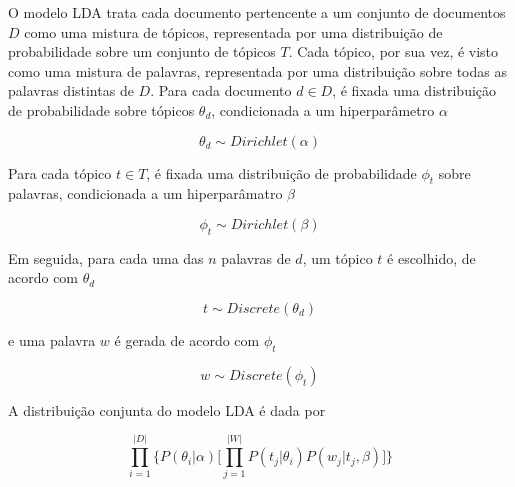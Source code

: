 


O modelo LDA trata cada documento pertencente a um conjunto de documentos \ensuremath{D} como uma mistura de tópicos, representada por uma distribuição de probabilidade sobre um conjunto de tópicos \ensuremath{T}. Cada tópico, por sua vez, é visto como uma mistura de palavras, representada por uma distribuição sobre todas as palavras distintas de \ensuremath{D}. Para cada documento \ensuremath{d \in D}, é fixada uma distribuição de probabilidade sobre tópicos \ensuremath{\theta_d}, condicionada a um hiperparâmetro \ensuremath{\alpha}

\begin{equation}
\label{lda:topic}
\ensuremath{\theta_d \sim Dirichlet(\alpha)}
\end{equation}

Para cada tópico \ensuremath{t \in T}, é fixada uma distribuição de probabilidade \ensuremath{\phi_t} sobre palavras, condicionada a um hiperparâmatro \ensuremath{\beta}

\begin{equation}
\label{lda:word}
\ensuremath{\phi_t \sim Dirichlet(\beta)}
\end{equation}

Em seguida, para cada uma das \ensuremath{n} palavras de \ensuremath{d}, um tópico \ensuremath{t} é escolhido, de acordo com \ensuremath{\theta_d}

\begin{equation}
\label{lda:topic-chosen}
\ensuremath{t \sim Discrete(\theta_d)}
\end{equation}

e uma palavra \ensuremath{w} é gerada de acordo com \ensuremath{\phi_t}

\begin{equation}
\label{lda:word-chosen}
\ensuremath{w \sim Discrete(\phi_t)}
\end{equation}

A distribuição conjunta do modelo LDA é dada por

\begin{equation}
\label{joint:lda}
\ensuremath{\prod_{i=1}^{|D|} \bigg\{P(\theta_i|\alpha)\bigg[\prod_{j=1}^{|W|}P(t_j|\theta_i)P(w_j|t_j,\beta)\bigg]\bigg\}}  
\end{equation}

